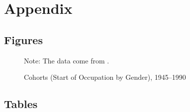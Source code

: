 \documentclass[a4paper, oneside, hyperfootnotes = false]{article}
\begin{document}
{\fontsize{11pt}{16.5pt}\selectfont

{}
\section*{Appendix}
\label{appendix}

{}
\subsection*{Figures}
\label{figures}

\begin{figure}[ht]
    \centering
    \caption{Cohorts (Start of Occupation by Gender), 1945–1990}
    \label{fig:mayer}
    \fontsize{9pt}{11pt}\selectfont
	\def\svgwidth{\textwidth}
	
    \vspace{2mm}
    \parbox{10cm}{
    \linespread{1}\footnotesize Note: The data come from \cite{Mayer1995}.}
\end{figure}

\clearpage

{}
\subsection*{Tables}
\label{tables}

}
\end{document}
